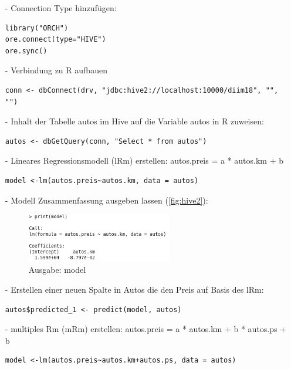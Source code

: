 \begin{itemize}
\item[-] Connection Type hinzufügen:

\begin{lstlisting}
library("ORCH")
ore.connect(type="HIVE")
ore.sync()
\end{lstlisting}

\item[-] Verbindung zu R aufbauen
\begin{lstlisting}
conn <- dbConnect(drv, "jdbc:hive2://localhost:10000/diim18", "", "")
\end{lstlisting}

\item[-] Inhalt der Tabelle autos im Hive auf die Variable autos in R zuweisen:
\begin{lstlisting}
autos <- dbGetQuery(conn, "Select * from autos")
\end{lstlisting}

\item[-] Lineares Regressionsmodell (lRm) erstellen: autos.preis = a * autos.km + b
\begin{lstlisting}
model <-lm(autos.preis~autos.km, data = autos)
\end{lstlisting}

\item[-] Modell Zusammenfassung ausgeben lassen (\autoref{fig:hive2}):
\begin{figure}[!htb]
        \begin{minipage}{1\textwidth}
                \centering
                \includegraphics[width=0.60\textwidth]{pics/autos_model_1.png}\par\vspace{0cm}
                \caption{Ausgabe: model}
                \label{fig:hive2}
        \end{minipage}
\end{figure}


\item[-] Erstellen einer neuen Spalte in Autos die den Preis auf Basis des lRm:
\begin{lstlisting}
autos$predicted_1 <- predict(model, autos)
\end{lstlisting}

\item[-] multiples Rm (mRm) erstellen: autos.preis = a * autos.km + b * autos.ps + b
\begin{lstlisting}
model <-lm(autos.preis~autos.km+autos.ps, data = autos)
\end{lstlisting}


\end{itemize}
